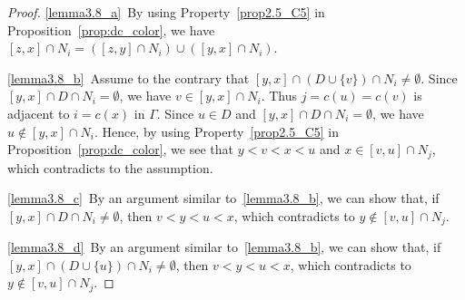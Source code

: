 \begin{proof}
\ref{lemma3.8_a}~By using Property~\ref{prop2.5_C5} in Proposition~\ref{prop:dc_color}, 
we have $[z,x] \cap N_i = ( [z,y] \cap N_i ) \cup ( [y,x] \cap N_i)$.

\ref{lemma3.8_b}~Assume to the contrary that $[y,x] \cap (D \cup \{ v \}) \cap N_i \neq \emptyset$.
Since $[y,x] \cap D \cap N_i = \emptyset$, we have $v \in [y,x] \cap N_i$.
Thus $j = c(u) = c(v)$ is adjacent to $i = c(x)$ in $\Gamma$.
Since $u \in D$ and $[y,x] \cap D \cap N_i = \emptyset$, we have $u \not\in [y,x] \cap N_i$.
Hence, by using Property~\ref{prop2.5_C5} in Proposition~\ref{prop:dc_color},
we see that $y < v < x < u$ and $x \in [v,u] \cap N_j$, 
which contradicts to the assumption.

\ref{lemma3.8_c}~By an argument similar to~\ref{lemma3.8_b}, we can show that, if $[y,x] \cap D \cap N_i \neq \emptyset$, 
then $v < y < u < x$, which contradicts to $y \not\in [v,u] \cap N_j$.

\ref{lemma3.8_d}~By an argument similar to~\ref{lemma3.8_b}, we can show that, if $[y,x] \cap (D \cup \{ u \}) \cap N_i \neq \emptyset$, 
then $v < y < u < x$, which contradicts to $y \not\in [v,u] \cap N_j$.
\end{proof}

